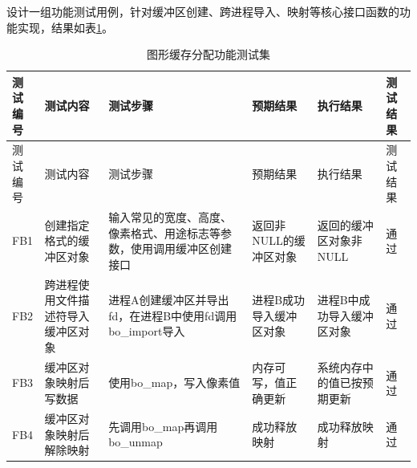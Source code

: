 设计一组功能测试用例，针对缓冲区创建、跨进程导入、映射等核心接口函数的功能实现，结果如表\ref{tab:图形缓存分配功能测试集}。

\begin{longtable}{lp{3cm}p{3cm}p{2cm}p{2cm}l}
  \caption{图形缓存分配功能测试集}\label{tab:图形缓存分配功能测试集} \\
  \hline
  \makecell[l]{测试\\编号} &  测试内容 & 测试步骤 & 预期结果 & 执行结果 & 测试结果\\
  \hline
  \endfirsthead
  \hline
  \makecell[l]{测试\\编号} &  测试内容 & 测试步骤 & 预期结果 & 执行结果 & 测试结果\\
  \hline
  \endhead
  FB1& 创建指定格式的缓冲区对象 & 输入常见的宽度、高度、像素格式、用途标志等参数，使用调用缓冲区创建接口 & 返回非NULL的缓冲区对象 & 返回的缓冲区对象非NULL & 通过\\
  FB2 & 跨进程使用文件描述符导入缓冲区对象 & 进程A创建缓冲区并导出fd，在进程B中使用fd调用bo\_import导入 & 进程B成功导入缓冲区对象 & 进程B中成功导入缓冲区对象 & 通过\\
  FB3 & 缓冲区对象映射后写数据 & 使用bo\_map，写入像素值 & 内存可写，值正确更新 & 系统内存中的值已按预期更新 & 通过\\
  FB4 & 缓冲区对象映射后解除映射  & 先调用bo\_map再调用bo\_unmap & 成功释放映射 & 成功释放映射 & 通过\\
  \hline
\end{longtable}


